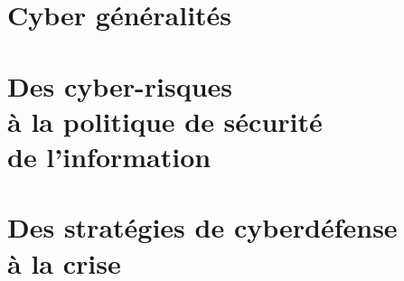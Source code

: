 %
%



\part{Cyber généralités}




\part[Gestion des risques]{Des cyber-risques \\à la politique de sécurité \\de l'information}




\part[sécurité opérationnelle]{Des stratégies de cyberdéfense \\à la crise}


